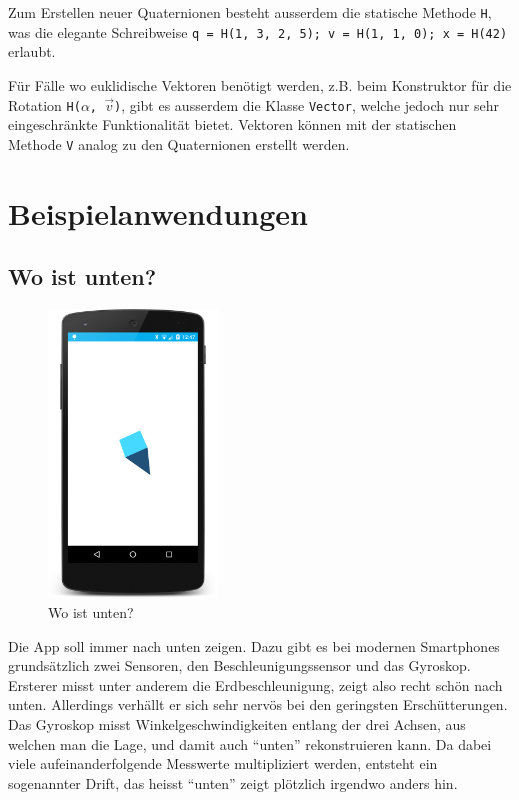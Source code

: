 \documentclass[12pt]{article}
\begin{document}
  Zum Erstellen neuer Quaternionen besteht ausserdem die statische Methode \texttt{H}, was die elegante Schreibweise \texttt{q = H(1, 3, 2, 5); v = H(1, 1, 0); x = H(42)} erlaubt. 

  Für Fälle wo euklidische Vektoren benötigt werden, z.B. beim Konstruktor für die Rotation \texttt{H($\alpha$, $\vec{v}$)}, gibt es ausserdem die Klasse \texttt{Vector}, welche jedoch nur sehr eingeschränkte Funktionalität bietet. Vektoren können mit der statischen Methode \texttt{V} analog zu den Quaternionen erstellt werden.

\newpage
  \section{Beispielanwendungen}
  \subsection{Wo ist unten?}

\begin{figure}
    \vspace{-12pt}
    \centering
    \includegraphics[width=0.4\textwidth]{down.png}
    \vspace{-18pt}
    \caption{Wo ist unten?}
    \label{fig:screenshot_down}
\end{figure}
  Die App soll immer nach unten zeigen. Dazu gibt es bei modernen Smartphones grundsätzlich zwei Sensoren, den Beschleunigungssensor und das Gyroskop. Ersterer misst unter anderem die Erdbeschleunigung, zeigt also recht schön nach unten. Allerdings verhällt er sich sehr nervös bei den geringsten Erschütterungen. Das Gyroskop misst
Winkelgeschwindigkeiten entlang der drei Achsen, aus welchen man die Lage, und damit auch ``unten'' rekonstruieren kann. Da dabei viele aufeinanderfolgende Messwerte multipliziert werden, entsteht ein sogenannter Drift, das heisst ``unten'' zeigt plötzlich irgendwo anders hin.
\end{document}
